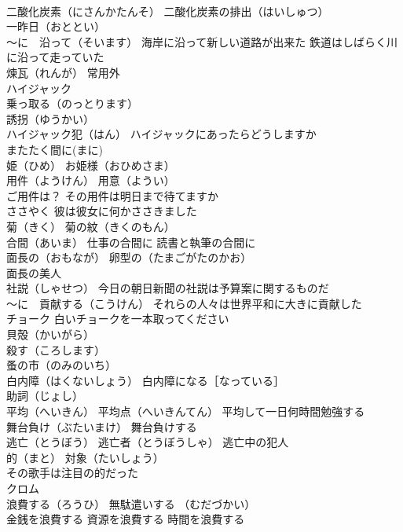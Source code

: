 \documentclass[8pt]{extreport}
\begin{document}
\begin{CJK}{UTF8}{min}
\\	二酸化炭素（にさんかたんそ） 二酸化炭素の排出（はいしゅつ）
\\	一昨日（おととい）
\\	～に　沿って（そいます） 海岸に沿って新しい道路が出来た 鉄道はしばらく川に沿って走っていた
\\	煉瓦（れんが） 常用外
\\	ハイジャック 
\\	乗っ取る（のっとります）
\\	誘拐（ゆうかい）
\\	ハイジャック犯（はん） ハイジャックにあったらどうしますか
\\	またたく間に(まに)
\\	姫（ひめ） お姫様（おひめさま）
\\	用件（ようけん） 用意（ようい）
\\	ご用件は？ その用件は明日まで待てますか
\\	ささやく 彼は彼女に何かささきました
\\	菊（きく） 菊の紋（きくのもん）
\\	合間（あいま） 仕事の合間に 読書と執筆の合間に
\\	面長の（おもなが） 卵型の（たまごがたのかお）
\\	面長の美人
\\	社説（しゃせつ） 今日の朝日新聞の社説は予算案に関するものだ
\\	～に　貢献する（こうけん） それらの人々は世界平和に大きに貢献した
\\	チョーク 白いチョークを一本取ってください
\\	貝殻（かいがら）
\\	殺す（ころします）
\\	蚤の市（のみのいち）
\\	白内障（はくないしょう） 白内障になる［なっている］
\\	助詞（じょし）
\\	平均（へいきん） 平均点（へいきんてん） 平均して一日何時間勉強する
\\	舞台負け（ぶたいまけ） 舞台負けする
\\	逃亡（とうぼう） 逃亡者（とうぼうしゃ） 逃亡中の犯人
\\	的（まと） 対象（たいしょう）
\\	その歌手は注目の的だった
\\	クロム
\\	浪費する（ろうひ） 無駄遣いする （むだづかい） 
\\	金銭を浪費する 資源を浪費する 時間を浪費する

\end{CJK}
\end{document}
